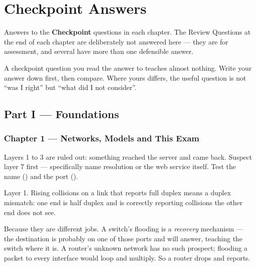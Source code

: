 \chapter{Checkpoint Answers}\label{app:answers}

Answers to the \textbf{Checkpoint} questions in each chapter. The Review
Questions at the end of each chapter are deliberately not answered here --- they
are for assessment, and several have more than one defensible answer.

\begin{alertbox}
A checkpoint question you read the answer to teaches almost nothing. Write your
answer down first, then compare. Where yours differs, the useful question is not
``was I right'' but ``what did I not consider''.
\end{alertbox}

\section*{Part I --- Foundations}

\subsection*{Chapter 1 --- Networks, Models and This Exam}
\begin{tightnum}
  \item Layers 1 to 3 are ruled out: something reached the server and came back.
        Suspect layer 7 first --- specifically name resolution or the web service
        itself. Test the name () and the port ().
  \item Layer 1. Rising collisions on a link that reports full duplex means a
        duplex mismatch: one end is half duplex and is correctly reporting
        collisions the other end does not see.
  \item Because they are different jobs. A switch's flooding is a \emph{recovery}
        mechanism --- the destination is probably on one of those ports and will
        answer, teaching the switch where it is. A router's unknown network has no
        such prospect; flooding a packet to every interface would loop and
        multiply. So a router drops and reports.
\end{tightnum}

